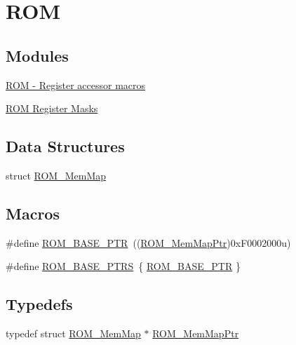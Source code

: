 \hypertarget{group___r_o_m___peripheral}{}\section{R\+OM}
\label{group___r_o_m___peripheral}
\subsection*{Modules}
\begin{DoxyCompactItemize}
\item 
\hyperlink{group___r_o_m___register___accessor___macros}{R\+O\+M -\/ Register accessor macros}
\item 
\hyperlink{group___r_o_m___register___masks}{R\+O\+M Register Masks}
\end{DoxyCompactItemize}
\subsection*{Data Structures}
\begin{DoxyCompactItemize}
\item 
struct \hyperlink{struct_r_o_m___mem_map}{R\+O\+M\+\_\+\+Mem\+Map}
\end{DoxyCompactItemize}
\subsection*{Macros}
\begin{DoxyCompactItemize}
\item 
\#define \hyperlink{group___r_o_m___peripheral_ga5ad426d10b6832ca7012e8767113f686}{R\+O\+M\+\_\+\+B\+A\+S\+E\+\_\+\+P\+TR}~((\hyperlink{group___r_o_m___peripheral_ga443285c54b394d010d2dccd28607e4b4}{R\+O\+M\+\_\+\+Mem\+Map\+Ptr})0x\+F0002000u)
\item 
\#define \hyperlink{group___r_o_m___peripheral_ga41e000a3e59f16dd8f395cebcb883e82}{R\+O\+M\+\_\+\+B\+A\+S\+E\+\_\+\+P\+T\+RS}~\{ \hyperlink{group___r_o_m___peripheral_ga5ad426d10b6832ca7012e8767113f686}{R\+O\+M\+\_\+\+B\+A\+S\+E\+\_\+\+P\+TR} \}
\end{DoxyCompactItemize}
\subsection*{Typedefs}
\begin{DoxyCompactItemize}
\item 
typedef struct \hyperlink{struct_r_o_m___mem_map}{R\+O\+M\+\_\+\+Mem\+Map} $\ast$ \hyperlink{group___r_o_m___peripheral_ga443285c54b394d010d2dccd28607e4b4}{R\+O\+M\+\_\+\+Mem\+Map\+Ptr}
\end{DoxyCompactItemize}


